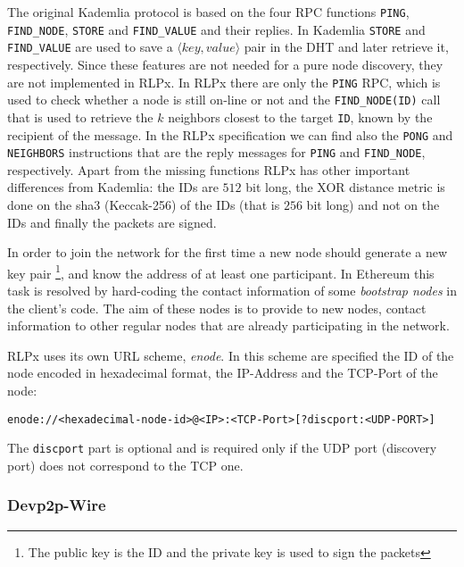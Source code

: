 The original Kademlia protocol is based on the four RPC functions 
\verb|PING|, \verb|FIND_NODE|,
\verb|STORE| and \verb|FIND_VALUE| and their replies.
In Kademlia \verb|STORE| and \verb|FIND_VALUE| are used to save a 
$\langle key, value\rangle$ pair in the DHT and later retrieve it, respectively.
Since these features are not needed for a pure node discovery, they
are not implemented in RLPx.
In RLPx there are only the \verb|PING| RPC, which is used to check whether a
node is still on-line or not and the \verb|FIND_NODE(ID)| call that is used to
retrieve the $k$ neighbors closest to the target \verb|ID|, known by the
recipient of the message. In the RLPx specification we can find also 
the \verb|PONG| and \verb|NEIGHBORS| instructions that are the reply messages
for \verb|PING| and \verb|FIND_NODE|, respectively.
Apart from the missing functions RLPx has other important differences
from Kademlia:
the IDs are $512$ bit long, the XOR distance metric is done on the sha3 
(Keccak-256) of the IDs (that is $256$ bit long) and not on the IDs and 
finally the packets are signed.

In order to join the network for the first time a new node should 
generate a new key pair
\footnote{The public key is the ID and the private key is used to sign the packets}, and
know the address of at least one participant.
In Ethereum this task is resolved by hard-coding the contact information
of some \textit{bootstrap nodes} in the client's code.
The aim of these nodes is to provide to new nodes, contact information to
other regular nodes that are already participating in the network.

RLPx uses its own URL scheme, \emph{enode}.
In this scheme are specified the ID of the node encoded in hexadecimal format,
the IP-Address and the TCP-Port of the node: 
\begin{verbatim}
enode://<hexadecimal-node-id>@<IP>:<TCP-Port>[?discport:<UDP-PORT>]
\end{verbatim} 
The \verb|discport| part is optional and is required only if the
UDP port (discovery port) does not correspond to the TCP one.


\subsubsection{Devp2p-Wire}

